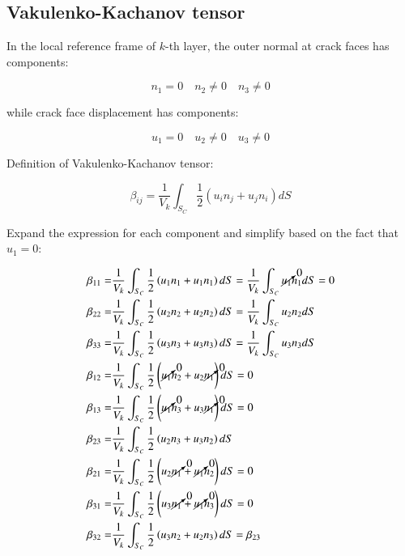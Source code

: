 \documentclass[review]{elsarticle}
\begin{document}
\subsection{Vakulenko-Kachanov tensor}

In the local reference frame of $k$-th layer, the outer normal at crack faces has components:

\begin{equation}
n_{1}=0\quad n_{2}\neq0\quad n_{3}\neq0
\end{equation}

while crack face displacement has components:

\begin{equation}
u_{1}=0\quad u_{2}\neq0\quad u_{3}\neq0
\end{equation}

Definition of Vakulenko-Kachanov tensor:

\begin{equation}
\beta_{ij}=\frac{1}{V_{k}}\int_{S_{C}}\frac{1}{2}\left(u_{i}n_{j}+u_{j}n_{i}\right)dS
\end{equation}

Expand the expression for each component and simplify based on the fact that $u_{1}=0$:

\begin{equation}
\begin{aligned}
\beta_{11}=&\frac{1}{V_{k}}\int_{S_{C}}\frac{1}{2}\left(u_{1}n_{1}+u_{1}n_{1}\right)dS=\frac{1}{V_{k}}\int_{S_{C}}\cancelto{0}{u_{1}}n_{1}dS=0\\
\beta_{22}=&\frac{1}{V_{k}}\int_{S_{C}}\frac{1}{2}\left(u_{2}n_{2}+u_{2}n_{2}\right)dS=\frac{1}{V_{k}}\int_{S_{C}}u_{2}n_{2}dS\\
\beta_{33}=&\frac{1}{V_{k}}\int_{S_{C}}\frac{1}{2}\left(u_{3}n_{3}+u_{3}n_{3}\right)dS=\frac{1}{V_{k}}\int_{S_{C}}u_{3}n_{3}dS\\
\beta_{12}=&\frac{1}{V_{k}}\int_{S_{C}}\frac{1}{2}\left(\cancelto{0}{u_{1}}n_{2}+u_{2}\cancelto{0}{n_{1}}\right)dS=0\\
\beta_{13}=&\frac{1}{V_{k}}\int_{S_{C}}\frac{1}{2}\left(\cancelto{0}{u_{1}}n_{3}+u_{3}\cancelto{0}{n_{1}}\right)dS=0\\
\beta_{23}=&\frac{1}{V_{k}}\int_{S_{C}}\frac{1}{2}\left(u_{2}n_{3}+u_{3}n_{2}\right)dS\\
\beta_{21}=&\frac{1}{V_{k}}\int_{S_{C}}\frac{1}{2}\left(u_{2}\cancelto{0}{n_{1}}+\cancelto{0}{u_{1}}n_{2}\right)dS=0\\
\beta_{31}=&\frac{1}{V_{k}}\int_{S_{C}}\frac{1}{2}\left(u_{3}\cancelto{0}{n_{1}}+\cancelto{0}{u_{1}}n_{3}\right)dS=0\\
\beta_{32}=&\frac{1}{V_{k}}\int_{S_{C}}\frac{1}{2}\left(u_{3}n_{2}+u_{2}n_{3}\right)dS=\beta_{23}\\
\end{aligned}
\end{equation}
\end{document}
